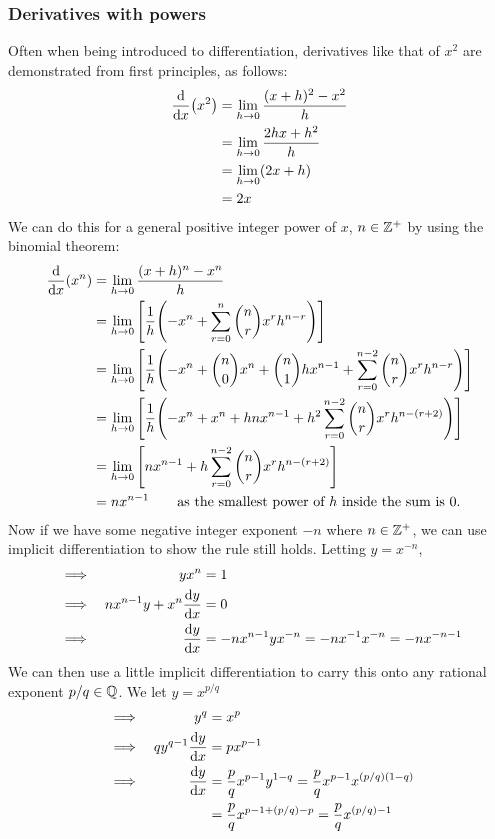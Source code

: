 \subsubsection{Derivatives with powers} \label{sec_calc_powers}

Often when being introduced to differentiation, derivatives like that of
\(x^2\) are demonstrated from first principles, as follows:
\begin{align*}
\dv{x}(x^2) &= \lim_{h \to 0} \frac{(x + h)^2 - x^2} h \\
    &= \lim_{h \to 0} \frac{2hx + h^2} h \\
    &= \lim_{h \to 0} (2x + h) \\
    &= 2x
\end{align*}
We can do this for a general positive integer power of \(x\),
\(n \in \mathbb Z^+\) by using the binomial theorem:
\begin{align*}
\dv{x}(x^n) &= \lim_{h \to 0} \frac{(x + h)^n - x^n} h \\
    &= \lim_{h \to 0} \bqty{\frac 1h \pqty{-x^n
                          + \sum_{r = 0}^n \binom nr x^r h^{n - r}}} \\
    &= \lim_{h \to 0} \bqty{\frac 1h \pqty{
                            -x^n + \binom n0 x^n + \binom n1 hx^{n - 1}
                          + \sum_{r = 0}^{n - 2}
                                \binom nr x^r h^{n - r}}} \\
    &= \lim_{h \to 0} \bqty{\frac 1h \pqty{-x^n + x^n + hnx^{n - 1}
                          + h^2 \sum_{r = 0}^{n - 2}
                                \binom nr x^r h^{n - (r + 2)}}} \\
    &= \lim_{h \to 0} \bqty{nx^{n - 1} + h \sum_{r = 0}^{n - 2}
                                \binom nr x^r h^{n - (r + 2)}} \\
    &= nx^{n-1} \qquad
        \text{as the smallest power of \(h\) inside the sum is 0.}
\end{align*}
Now if we have some negative integer exponent \(-n\) where
\(n \in \mathbb Z^+\), we can use implicit differentiation to show the rule
still holds. Letting \(y = x^{-n}\),
\begin{alignat*}{2}
&\implies& yx^n &= 1 \\
&\implies& nx^{n - 1}y + x^n \dv{y}{x} &= 0 \\
&\implies& \dv{y}{x} &= -nx^{n - 1}yx^{-n}
    = -nx^{-1}x^{-n} = -nx^{-n - 1}
\end{alignat*}
We can then use a little implicit differentiation to carry this onto any
rational exponent \(p / q \in \mathbb Q\). We let \(y = x^{p / q}\)
\begin{alignat*}{2}
&\implies& y^q &= x^p \\
&\implies& qy^{q - 1}\dv{y}{x} &= px^{p - 1} \\
&\implies& \dv{y}{x} &= \frac pq x^{p - 1}y^{1 - q}
    = \frac pq x^{p - 1}x^{(p / q)(1 - q)} \\
&&  &= \frac pq x^{p - 1 + (p / q) - p}
    = \frac pq x^{(p / q) - 1}
\end{alignat*}

